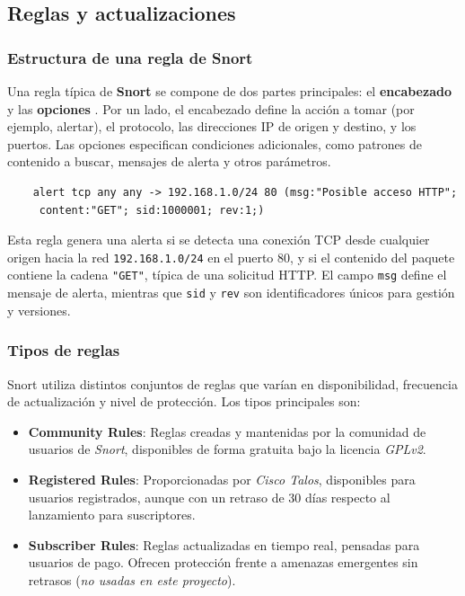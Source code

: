 \documentclass[11pt,a4paper,twoside]{report}
\begin{document}
\subsection{Reglas y actualizaciones}

\subsubsection{Estructura de una regla de Snort}

Una regla típica de \textbf{Snort} se compone de dos partes principales: el \textbf{encabezado} y las \textbf{opciones} \cite{snort3_rules_docs}. Por un lado, el encabezado define la acción a tomar (por ejemplo, alertar), el protocolo, las direcciones IP de origen y destino, y los puertos. Las opciones especifican condiciones adicionales, como patrones de contenido a buscar, mensajes de alerta y otros parámetros.

\begin{verbatim}
	alert tcp any any -> 192.168.1.0/24 80 (msg:"Posible acceso HTTP";
	 content:"GET"; sid:1000001; rev:1;)
\end{verbatim}

Esta regla genera una alerta si se detecta una conexión TCP desde cualquier origen hacia la red \texttt{192.168.1.0/24} en el puerto 80, y si el contenido del paquete contiene la cadena \texttt{"GET"}, típica de una solicitud HTTP. El campo \texttt{msg} define el mensaje de alerta, mientras que \texttt{sid} y \texttt{rev} son identificadores únicos para gestión y versiones.


\subsubsection{Tipos de reglas}

Snort utiliza distintos conjuntos de reglas que varían en disponibilidad, frecuencia de actualización y nivel de protección. Los tipos principales son:

\begin{itemize}
	\item \textbf{Community Rules}: Reglas creadas y mantenidas por la comunidad de usuarios de \textit{Snort}, disponibles de forma gratuita bajo la licencia \textit{GPLv2}.
	
	\item \textbf{Registered Rules}: Proporcionadas por \textit{Cisco Talos}, disponibles para usuarios registrados, aunque con un retraso de 30 días respecto al lanzamiento para suscriptores.
	
	\item \textbf{Subscriber Rules}: Reglas actualizadas en tiempo real, pensadas para usuarios de pago. Ofrecen protección frente a amenazas emergentes sin retrasos \cite{snort_talos} (\textit{no usadas en este proyecto}).
\end{itemize}
\end{document}
